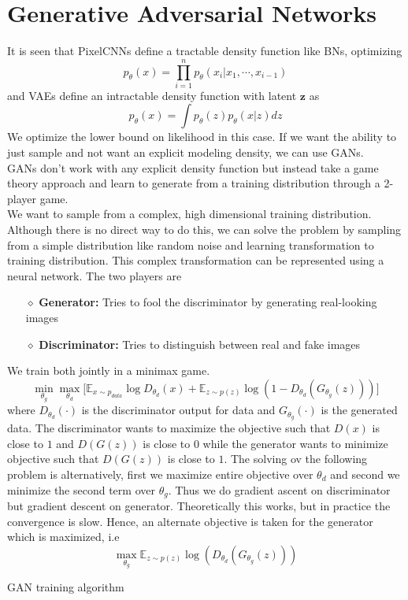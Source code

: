 \section{Generative Adversarial Networks}
It is seen that PixelCNNs define a tractable density function like BNs, optimizing
\begin{equation}
	p_\theta(x) = \prod_{i=1}^n p_\theta (x_i | x_1, \cdots, x_{i-1})
\end{equation}
and VAEs define an intractable density function with latent $\mathbf z$ as
\begin{equation}
	p_\theta(x) = \int p_\theta(z) p_\theta(x|z) dz
\end{equation}
We optimize the lower bound on likelihood in this case. If we want the ability to just sample and not want an explicit modeling density, we can use GANs.
\\
GANs don't work with any explicit density function but instead take a game theory approach and learn to generate from a training distribution through a 2-player game. \\
We want to sample from a complex, high dimensional training distribution. Although there is no direct way to do this, we can solve the problem by sampling from a simple distribution like random noise and learning transformation to training distribution. This complex transformation  can be represented using a neural network. The two players are
\begin{itemize}
	\item[$\diamond$] \textbf{Generator:} Tries to fool the discriminator by generating real-looking images
	\item[$\diamond$] \textbf{Discriminator:} Tries to distinguish between real and fake images
\end{itemize}
We train both jointly in a minimax game.
\begin{equation}
	\min_{\theta_g} \max_{\theta_d} \Big [\mathbb{E}_{x \sim p_{data}}\log D_{\theta_d}(x) + \mathbb{E}_{z \sim p(z)} \log(1- D_{\theta_d}(G_{\theta_g} (z)))\Big]
\end{equation}
where $D_{\theta_d}(\cdot)$ is the discriminator output for data and $G_{\theta_g}(\cdot)$ is the generated data. The discriminator wants to maximize the objective such that $D(x)$ is close to $1$ and $D(G(z))$ is close to 0 while the generator wants to minimize objective such that $D(G(z))$ is close to $1$. The solving ov the following problem is alternatively, first we maximize entire objective over $\theta_d$ and second we minimize the second term over $\theta_g$. Thus we do gradient ascent on discriminator but gradient descent on generator. Theoretically this works, but in practice the convergence is slow. Hence, an alternate objective is taken for the generator which is maximized, i.e
\begin{equation}
	\max_{\theta_g} \mathbb{E}_{z \sim p(z)} \log(D_{\theta_d}(G_{\theta_g}(z)))
\end{equation}
\begin{algorithm}
\caption{GAN training algorithm}
\end{algorithm}